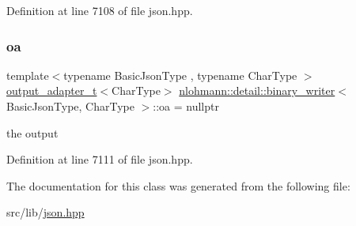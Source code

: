 Definition at line 7108 of file json.\+hpp.

\mbox{\label{classnlohmann_1_1detail_1_1binary__writer_a6f15b782a7900f50ef37d123008e601b}} 
\subsubsection{\texorpdfstring{oa}{oa}}
{\footnotesize\ttfamily template$<$typename Basic\+Json\+Type , typename Char\+Type $>$ \\
\hyperlink{namespacenlohmann_1_1detail_a9b680ddfb58f27eb53a67229447fc556}{output\+\_\+adapter\+\_\+t}$<$Char\+Type$>$ \hyperlink{classnlohmann_1_1detail_1_1binary__writer}{nlohmann\+::detail\+::binary\+\_\+writer}$<$ Basic\+Json\+Type, Char\+Type $>$\+::oa = nullptr\hspace{0.3cm}{\ttfamily [private]}}



the output 



Definition at line 7111 of file json.\+hpp.



The documentation for this class was generated from the following file\+:\begin{DoxyCompactItemize}
\item 
src/lib/\hyperlink{json_8hpp}{json.\+hpp}\end{DoxyCompactItemize}
